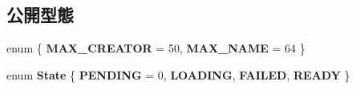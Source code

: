 \subsection*{公開型態}
\begin{DoxyCompactItemize}
\item 
enum \{ {\bfseries M\+A\+X\+\_\+\+C\+R\+E\+A\+T\+OR} = 50, 
{\bfseries M\+A\+X\+\_\+\+N\+A\+ME} = 64
 \}\hypertarget{class_magnum_1_1_resource_access_a8196b9cc6f30e6991e6c2d1caad6412e}{}\label{class_magnum_1_1_resource_access_a8196b9cc6f30e6991e6c2d1caad6412e}

\item 
enum {\bfseries State} \{ {\bfseries P\+E\+N\+D\+I\+NG} = 0, 
{\bfseries L\+O\+A\+D\+I\+NG}, 
{\bfseries F\+A\+I\+L\+ED}, 
{\bfseries R\+E\+A\+DY}
 \}\hypertarget{class_magnum_1_1_resource_access_a159e8791782791c10fa4807a8efc6b8e}{}\label{class_magnum_1_1_resource_access_a159e8791782791c10fa4807a8efc6b8e}

\end{DoxyCompactItemize}
